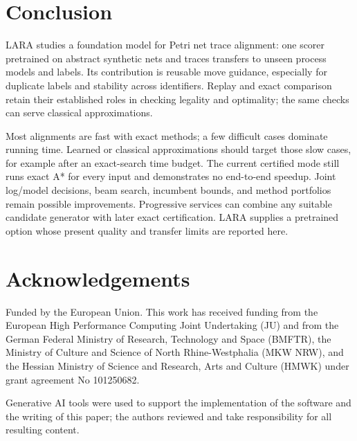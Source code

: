 \documentclass[manuscript,screen,nonacm]{acmart}
\begin{document}
\section{Conclusion}
\label{sec:conclusion}

LARA studies a foundation model for Petri net trace alignment: one scorer pretrained on abstract synthetic nets and traces transfers to unseen process models and labels. Its contribution is reusable move guidance, especially for duplicate labels and stability across identifiers. Replay and exact comparison retain their established roles in checking legality and optimality; the same checks can serve classical approximations.

Most alignments are fast with exact methods; a few difficult cases dominate running time. Learned or classical approximations should target those slow cases, for example after an exact-search time budget. The current certified mode still runs exact A* for every input and demonstrates no end-to-end speedup. Joint log/model decisions, beam search, incumbent bounds, and method portfolios remain possible improvements. Progressive services can combine any suitable candidate generator with later exact certification. LARA supplies a pretrained option whose present quality and transfer limits are reported here.

\section*{Acknowledgements}

Funded by the European Union. This work has received funding from the European High Performance Computing Joint Undertaking (JU) and from the German Federal Ministry of Research, Technology and Space (BMFTR), the Ministry of Culture and Science of North Rhine-Westphalia (MKW NRW), and the Hessian Ministry of Science and Research, Arts and Culture (HMWK) under grant agreement No 101250682.

Generative AI tools were used to support the implementation of the software and the writing of this paper; the authors reviewed and take responsibility for all resulting content.



\end{document}
